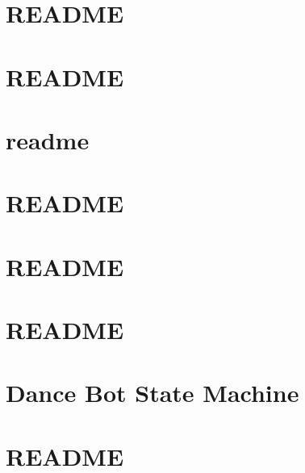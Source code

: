 \documentclass[twoside]{book}
\newcommand{\+}{\discretionary{\mbox{\scriptsize$\hookleftarrow$}}{}{}}
\begin{document}
\chapter{R\+E\+A\+D\+ME}
\label{md_smacc_client_library_ros_publisher_client_README}

\chapter{R\+E\+A\+D\+ME}
\label{md_smacc_client_library_ros_timer_client_README}

\chapter{readme}
\label{md_smacc_diagnostics_readme}

\chapter{R\+E\+A\+D\+ME}
\label{md_smacc_sm_reference_library_sm_atomic_README}

\chapter{R\+E\+A\+D\+ME}
\label{md_smacc_sm_reference_library_sm_atomic_cb_README}

\chapter{R\+E\+A\+D\+ME}
\label{md_smacc_sm_reference_library_sm_calendar_week_README}

\chapter{Dance Bot State Machine}
\label{md_smacc_sm_reference_library_sm_dance_bot_launch_readme}

\chapter{R\+E\+A\+D\+ME}
\label{md_smacc_sm_reference_library_sm_dance_bot_README}

\end{document}
